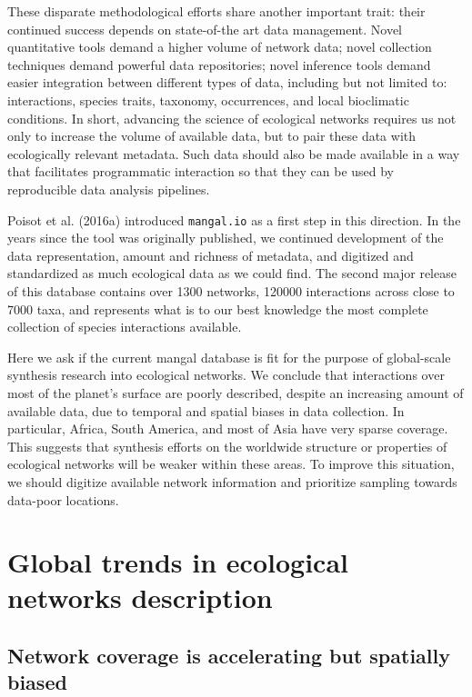 These disparate methodological efforts share another important trait:
their continued success depends on state-of-the art data management.
Novel quantitative tools demand a higher volume of network data; novel
collection techniques demand powerful data repositories; novel inference
tools demand easier integration between different types of data,
including but not limited to: interactions, species traits, taxonomy,
occurrences, and local bioclimatic conditions. In short, advancing the
science of ecological networks requires us not only to increase the
volume of available data, but to pair these data with ecologically
relevant metadata. Such data should also be made available in a way that
facilitates programmatic interaction so that they can be used by
reproducible data analysis pipelines.

Poisot et al. (2016a) introduced \texttt{mangal.io} as a first step in
this direction. In the years since the tool was originally published, we
continued development of the data representation, amount and richness of
metadata, and digitized and standardized as much ecological data as we
could find. The second major release of this database contains over 1300
networks, 120000 interactions across close to 7000 taxa, and represents
what is to our best knowledge the most complete collection of species
interactions available.

Here we ask if the current mangal database is fit for the purpose of
global-scale synthesis research into ecological networks. We conclude
that interactions over most of the planet's surface are poorly
described, despite an increasing amount of available data, due to
temporal and spatial biases in data collection. In particular, Africa,
South America, and most of Asia have very sparse coverage. This suggests
that synthesis efforts on the worldwide structure or properties of
ecological networks will be weaker within these areas. To improve this
situation, we should digitize available network information and
prioritize sampling towards data-poor locations.

\hypertarget{global-trends-in-ecological-networks-description}{%
\section{Global trends in ecological networks
description}\label{global-trends-in-ecological-networks-description}}

\hypertarget{network-coverage-is-accelerating-but-spatially-biased}{%
\subsection{Network coverage is accelerating but spatially
biased}\label{network-coverage-is-accelerating-but-spatially-biased}}

